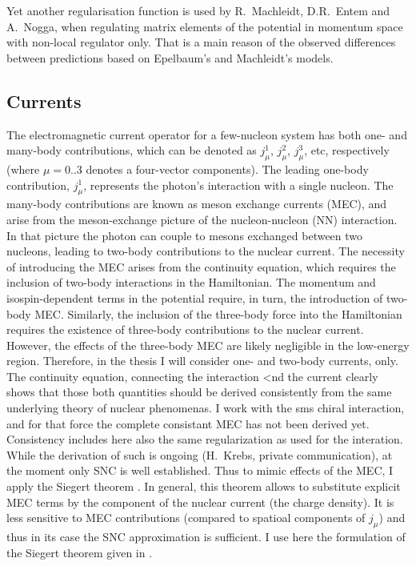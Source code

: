
Yet another regularisation function  is used by R.~Machleidt, D.R.~Entem and A.~Nogga, 
when regulating matrix elements of the potential in momentum space with non-local regulator only.
That is a main reason of the observed differences between predictions based on Epelbaum's
and Machleidt's models. 

\subsection*{Currents}


The electromagnetic current operator for a few-nucleon system has both one- and many-body contributions, which
can be denoted as $j_\mu^1$, $j_\mu^2$, $j_\mu^3$, etc, respectively 
(where $\mu = 0..3$ denotes a four-vector components).
The leading one-body contribution,
$j_\mu^1$, represents the photon's interaction with a single nucleon. The many-body contributions are known as
meson exchange currents (MEC), and arise from the meson-exchange picture of the nucleon-nucleon (NN)
interaction. 
In that picture the photon can couple to mesons exchanged between two nucleons, leading to two-body contributions to
the nuclear current.
The necessity of introducing the MEC arises from the continuity equation, which requires the inclusion of
two-body interactions in the Hamiltonian. The momentum and isospin-dependent terms 
in the potential require, in turn, the
introduction of two-body MEC. Similarly, the inclusion of the three-body force into the Hamiltonian requires the
existence of three-body contributions to the nuclear current. However, the effects of the three-body MEC are
likely negligible in the low-energy region.
Therefore, in the thesis I will consider one- and two-body currents, only.
The continuity equation, connecting the interaction <nd the current clearly shows 
that those both quantities should be derived consistently from the same underlying theory
of nuclear phenomenas.
I work with the \gls{sms} chiral interaction, and for that force the complete consistant MEC
has not been derived yet.
Consistency includes here also the same regularization  as used for the interation.
While the derivation of such is ongoing (H.~Krebs, private communication), at the moment
only SNC is well established.
Thus to mimic  effects of the MEC, I apply the Siegert theorem \cite{Siegert, GolakKamad2000_ExplDescr}.
In general, this theorem allows to substitute
explicit MEC terms by the  component of the nuclear current (the charge density).
It is less sensitive to MEC contributions (compared to spatioal components of $j_\mu$)
and thus in its case the SNC approximation is sufficient.
I use here the formulation of the Siegert theorem given in \cite{GolakKamad2000_ExplDescr}.

